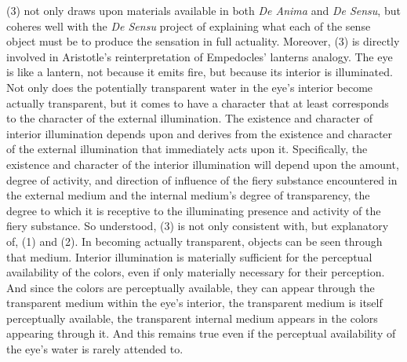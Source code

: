 (3) not only draws upon materials available in both \emph{De Anima} and \emph{De Sensu}, but coheres well with the \emph{De Sensu} project of explaining what each of the sense object must be to produce the sensation in full actuality. Moreover, (3) is directly involved in Aristotle's reinterpretation of Empedocles' lanterns analogy. The eye is like a lantern, not because it emits fire, but because its interior is illuminated. Not only does the potentially transparent water in the eye's interior become actually transparent, but it comes to have a character that at least corresponds to the character of the external illumination. The existence and character of interior illumination depends upon and derives from the existence and character of the external illumination that immediately acts upon it. Specifically, the existence and character of the interior illumination will depend upon the amount, degree of activity, and direction of influence of the fiery substance encountered in the external medium and the internal medium's degree of transparency, the degree to which it is receptive to the illuminating presence and activity of the fiery substance. So understood, (3) is not only consistent with, but explanatory of, (1) and (2). In becoming actually transparent, objects can be seen through that medium. Interior illumination is materially sufficient for the perceptual availability of the colors, even if only materially necessary for their perception. And since the colors are perceptually available, they can appear through the transparent medium within the eye's interior, the transparent medium is itself perceptually available, the transparent internal medium appears in the colors appearing through it. And this remains true even if the perceptual availability of the eye's water is rarely attended to.


